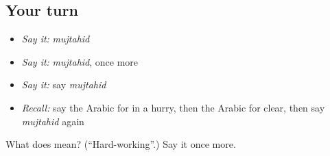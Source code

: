 \subsection*{Your turn}
\begin{itemize}
\raggedright
  \item \emph{Say it:} \emph{mujtahid}
  \item \emph{Say it:} \emph{mujtahid}, once more
  \item \emph{Say it:} say \emph{mujtahid}
  \item \emph{Recall:} say the Arabic for in a hurry, then the Arabic for clear, then say \emph{mujtahid} again
\end{itemize}

\begin{tcolorbox}[breakable,colback=teal!4,colframe=teal!35!black,title={Before you move on}]
What does  mean? (\textquotedblleft{}Hard-working\textquotedblright{}.) Say it once more.
\end{tcolorbox}
